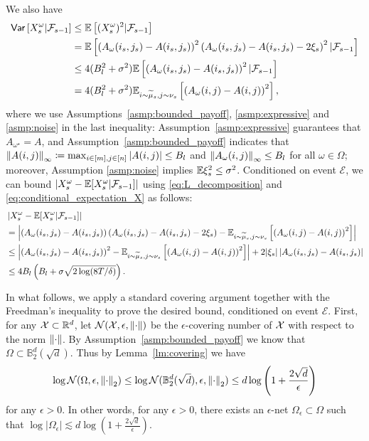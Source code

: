 We also have
\begin{align}\label{eq:conditional_var}
    \mathsf{Var}\left[X_s^\omega|{\mathcal{F}}_{s-1}\right]&\leq \mathbb{E}\left[(X_s^\omega)^2|{\mathcal{F}}_{s-1}\right]\notag\\
    &=\mathbb{E}\left[\left(A_\omega(i_s,j_s)-A(i_s,j_s)\right)^2\left(A_\omega(i_s,j_s)-A(i_s,j_s)-2\xi_s\right)^2|{\mathcal{F}}_{s-1}\right]\notag\\
    &\leq 4(B_l^2+\sigma^2)\mathbb{E}\left[\left(A_\omega(i_s,j_s)-A(i_s,j_s)\right)^2|{\mathcal{F}}_{s-1}\right]\notag\\
    &=4(B_l^2+\sigma^2)\mathbb{E}_{i\sim\widetilde{\mu}_s,j\sim\nu_s}\left[\left(A_\omega(i,j)-A(i,j)\right)^2\right],
\end{align}
where we use Assumptions~\ref{asmp:bounded_payoff}, \ref{asmp:expressive} and \ref{asmp:noise} in the last inequality: Assumption~\ref{asmp:expressive} guarantees that $A_{\omega^\star}=A$, and Assumption~\ref{asmp:bounded_payoff} indicates that $\left\| A(i,j) \right\|_\infty\coloneqq\max_{i\in[m],j\in[n]}|A(i,j)|\leq B_l$ and $\left\| A_\omega(i,j) \right\|_\infty\leq B_l$ for all $\omega\in\Omega$; moreover, Assumption \ref{asmp:noise} implies $\mathbb{E}\xi_s^2\leq \sigma^2$. 
Conditioned on event $\mathcal{E}$,
we can bound $|X_s^\omega-\mathbb{E}[X_s^\omega|{\mathcal{F}}_{s-1}]|$ using \eqref{eq:L_decomposition} and \eqref{eq:conditional_expectation_X} as follows:
\begin{align}\label{eq:bound_abs_X}
    & \left|X_s^\omega-\mathbb{E}[X_s^\omega|{\mathcal{F}}_{s-1}]\right|\notag\\
    &=\left|\left(A_\omega(i_s,j_s)-A(i_s,j_s)\right)\left(A_{\omega}(i_s,j_s)-A(i_s,j_s)-2\xi_s\right)-\mathbb{E}_{i\sim\widetilde{\mu}_s,j\sim\nu_s}\left[\left(A_{\omega}(i,j)-A(i,j)\right)^2\right]\right|\notag\\
    &\leq \left|\left(A_\omega(i_s,j_s)-A(i_s,j_s)\right)^2-\mathbb{E}_{i\sim\widetilde{\mu}_s,j\sim\nu_s}\left[\left(A_\omega(i,j)-A(i,j)\right)^2\right]\right|+2|\xi_s|\left|A_\omega(i_s,j_s)-A(i_s,j_s)\right|\notag\\
    &\leq 4B_l\left(B_l+\sigma\sqrt{2\log(8T/\delta)}\right).
\end{align}

In what follows, we apply a standard covering argument together with the Freedman's inequality to prove the desired bound, conditioned on event $\mathcal{E}$. First, for any ${\mathcal{X}}\subset\mathbb{R}^d$, let ${\mathcal{N}}({\mathcal{X}},\epsilon,\left\| \cdot \right\|)$ be the $\epsilon$-covering number of ${\mathcal{X}}$ with respect to the norm $\left\| \cdot \right\|$. 
By Assumption~\ref{asmp:bounded_payoff} we know that $\Omega\subset\mathbb{B}_2^d(\sqrt{d})$. Thus by Lemma~\ref{lm:covering} we have
\begin{align}\label{eq:covering}
    \log{\mathcal{N}}(\Omega, \epsilon, \left\| \cdot \right\|_2)\leq \log{\mathcal{N}}(\mathbb{B}_2^d(\sqrt{d}), \epsilon, \left\| \cdot \right\|_2)\leq d\log\left(1+\frac{2\sqrt{d}}{\epsilon}\right)
\end{align}
for any $\epsilon>0$.
%
In other words, for any $\epsilon>0$, there exists an $\epsilon$-net $\Omega_\epsilon\subset\Omega$ such that $\log|\Omega_\epsilon|\lesssim d\log\left(1+\frac{2\sqrt{d}}{\epsilon}\right)$.

